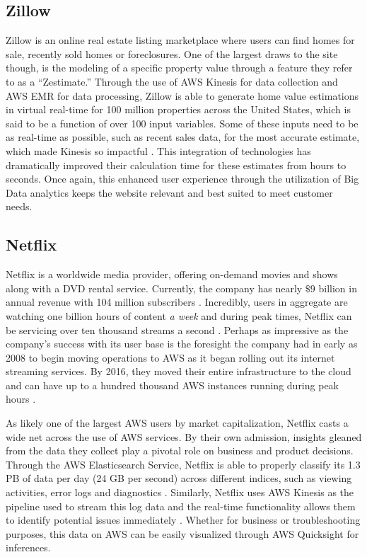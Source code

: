 \documentclass[sigconf]{acmart}
\begin{document}
\subsection{Zillow}
Zillow is an online real estate listing marketplace where users can find homes for sale, recently sold homes or foreclosures. One of the largest draws to the site though, is the modeling of a specific property value through a feature they refer to as a ``Zestimate.'' Through the use of AWS Kinesis for data collection and AWS EMR for data processing, Zillow is able to generate home value estimations in virtual real-time for 100 million properties across the United States, which is said to be a function of over 100 input variables\cite{zillow_aws}. Some of these inputs need to be as real-time as possible, such as recent sales data, for the most accurate estimate, which made Kinesis so impactful  \cite{zillow_data}. This integration of technologies has dramatically improved their calculation time for these estimates from hours to seconds\cite{zillow_aws}. Once again, this enhanced user experience through the utilization of Big Data analytics keeps the website relevant and best suited to meet customer needs. 
\subsection{Netflix}
Netflix is a worldwide media provider, offering on-demand movies and shows along with a DVD rental service. Currently, the company has nearly $\$9$ billion in annual revenue with 104 million subscribers \cite{nflx}. Incredibly, users in aggregate are watching one billion hours of content \emph{a week}  and during peak times, Netflix can be servicing over ten thousand streams a second \cite{nflx_bn}. Perhaps as impressive as the company's success with its user base is the foresight the company had in early as 2008 to begin moving operations to AWS as it began rolling out its internet streaming services. By 2016, they moved their entire infrastructure to the cloud and can have up to a hundred thousand AWS instances running during peak hours \cite{nflx_conf}. 

As likely one of the largest AWS users by market capitalization, Netflix casts a wide net across the use of AWS services. By their own admission, insights gleaned from the data they collect play a pivotal role on business and product decisions. Through the AWS Elasticsearch Service, Netflix is able to properly classify its 1.3 PB of data per day (24 GB per second) across different indices, such as viewing activities, error logs and diagnostics \cite{nflx_tech}. Similarly, Netflix uses AWS Kinesis as the pipeline used to stream this log data and the real-time functionality allows them to identify potential issues immediately \cite{nflx_kin}. Whether for business or troubleshooting purposes, this data on AWS can be easily visualized through AWS Quicksight for inferences. 
\end{document}
